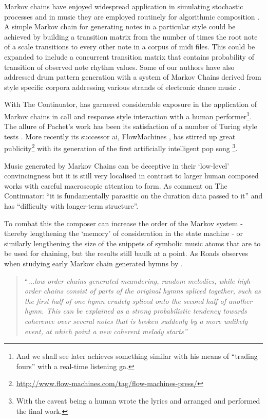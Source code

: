 Markov chains have enjoyed widespread application in simulating stochastic processes and in music they are employed routinely for algorithmic composition \citep{Fernandez2013, Eigenfeldt2009, Jorda2016}. A simple Markov chain for generating notes in a particular style could be achieved by building a transition matrix from the number of times the root note of a scale transitions to every other note in a corpus of \acrshort{midi} files. This could be expanded to include a concurrent transition matrix that contains probability of transition of observed note rhythm values. Some of our authors have also addressed drum pattern generation with a system of Markov Chains derived from style specific corpora addressing various strands of electronic dance music \cite{Jorda2016}.

With The Continuator, \cite{Pachet2002} has garnered considerable exposure in the application of Markov chains in call and response style interaction with a human performer\footnote{And we shall see later \cite{Biles1994} achieves something similar with his means of ``trading fours'' with a real-time listening \acrshort{ga}.}. The allure of Pachet's work has been its satisfaction of a number of Turing style tests \citep{Pachet2008}. More recently its successor \acrshort{ai}, FlowMachines \citep{Pachet2008a}, has stirred up great publicity\footnote{\url{http://www.flow-machines.com/tag/flow-machines-press/}} with its generation of the first artificially intelligent pop song \footnote{With the caveat being a human wrote the lyrics and arranged and performed the final work.}.

Music generated by Markov Chains can be deceptive in their `low-level' convincingness but it is still very localised in contrast to larger human composed works with careful macroscopic attention to form. As \cite{Collins2011a} comment on The Continuator: ``it is fundamentally parasitic on the duration data passed to it'' and has ``difficulty with longer-term structure''.

To combat this the composer can increase the order of the Markov system - thereby lengthening the `memory' of consideration in the state machine - or similarly lengthening the size of the snippets of symbolic music atoms that are to be used for chaining, but the results still baulk at a point. As Roads observes when studying early Markov chain generated hymns by \cite{Brooks1993}. 

\blockcquote[]{Roads1996}{``\textit{...low-order chains generated meandering, random melodies, while high-order chains consist of parts of the original hymns spliced together, such as the first half of one hymn crudely spliced onto the second half of another hymn. This can be explained as a strong probabilistic tendency towards coherence over several notes that is broken suddenly by a more unlikely event, at which point a new coherent melody starts''}}

